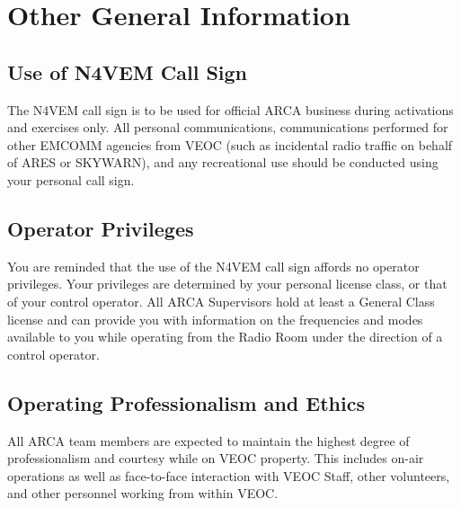 \documentclass[pdflatex,letterpaper,twoside,12pt]{book}
\begin{document}

\section{Other General Information}

\subsection{Use of N4VEM Call Sign}

The N4VEM call sign is to be used for official ARCA business during activations and exercises only.  All personal communications, communications performed for other EMCOMM agencies from VEOC (such as incidental radio traffic on behalf of ARES or SKYWARN), and any recreational use should be conducted using your personal call sign.

\subsection{Operator Privileges}

You are reminded that the use of the N4VEM call sign affords no operator privileges.  Your privileges are determined by your personal license class, or that of your control operator.  All ARCA Supervisors hold at least a General Class license and can provide you with information on the frequencies and modes available to you while operating from the Radio Room under the direction of a control operator.

\subsection{Operating Professionalism and Ethics}

All ARCA team members are expected to maintain the highest degree of professionalism and courtesy while on VEOC property.  This includes on-air operations as well as face-to-face interaction with VEOC Staff, other volunteers, and other personnel working from within VEOC.

\end{document}
